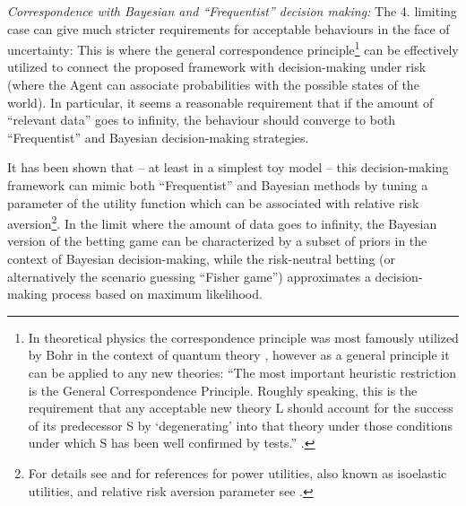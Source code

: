 \documentclass{article}
\begin{document}
{\it Correspondence with Bayesian and ``Frequentist'' decision making:}
The 4. limiting case can give much stricter requirements for acceptable behaviours in the face of uncertainty:
This is where the general correspondence principle\footnote{In theoretical physics the correspondence principle was most famously utilized by Bohr in the context of quantum theory \cite{sep:Correspondence,book:BohrCorrespondence}, however as a general principle it can be applied to any new theories: ``The most important heuristic restriction is the General Correspondence Principle. Roughly speaking, this is the requirement that any acceptable new theory L should account for the success of its predecessor S by ‘degenerating’ into that theory under those conditions under which S has been well confirmed by tests.'' \cite{book:CorrespondencePost}.} can be effectively utilized to connect the proposed framework with decision-making under risk (where the Agent can associate probabilities with the possible states of the world).
In particular, it seems a reasonable requirement that if the amount of ``relevant data'' goes to infinity, the behaviour should converge to both ``Frequentist'' and Bayesian decision-making strategies.

It has been shown that -- at least in a simplest toy model -- this decision-making framework can mimic both ``Frequentist'' and Bayesian methods by tuning a parameter of the utility function which can be associated with relative risk aversion\footnote{For details see \cite{arxiv:StatisticalGamesKonczer2024} and for references for power utilities, also known as isoelastic utilities, and relative risk aversion parameter see \cite{book:EconomicsDictionary,book:Arrow, paper:Pratt}.}.
In the limit where the amount of data goes to infinity, the Bayesian version of the betting game can be characterized by a subset of priors in the context of Bayesian decision-making, while the risk-neutral betting (or alternatively the scenario guessing ``Fisher game'') approximates a decision-making process based on maximum likelihood.
\end{document}

